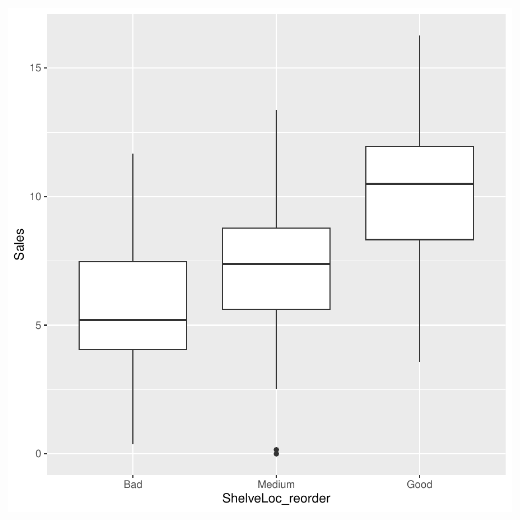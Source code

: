 \documentclass{article}\usepackage[]{graphicx}\usepackage[]{xcolor}
\newenvironment{knitrout}{}{} %
\begin{document}
\begin{knitrout}
{\centering \includegraphics[width=.6\linewidth]{figure/TREE1-SOLUCION-Rnwauto-report-3} 

}



\end{knitrout}
\end{document}
